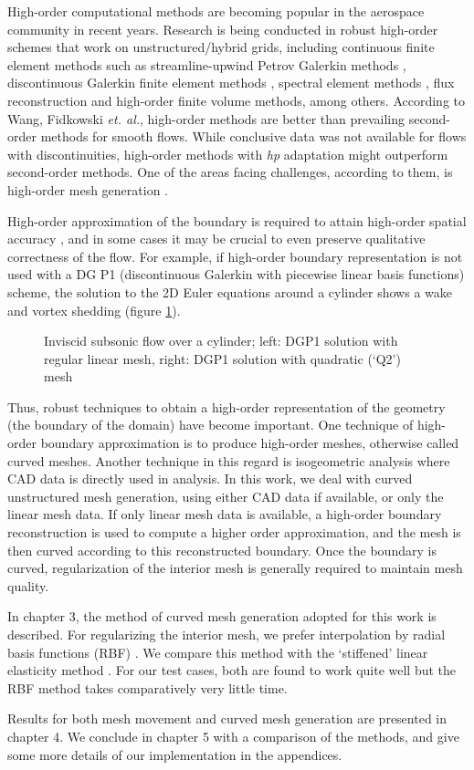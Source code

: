 High-order computational methods are becoming popular in the aerospace community in recent years. Research is being conducted in robust high-order schemes that work on unstructured/hybrid grids, including continuous finite element methods such as streamline-upwind Petrov Galerkin methods \cite{appl:supg}, discontinuous Galerkin finite element methods \cite{solver, curve:hartmann, appl:mavriplis}, spectral element methods \cite{appl:spectral}, flux reconstruction \cite{appl:fr} and high-order finite volume methods, among others. According to Wang, Fidkowski \emph{et. al.}, high-order methods are better than prevailing second-order methods for smooth flows. While conclusive data was not available for flows with discontinuities, high-order methods with \emph{hp} adaptation might outperform second-order methods. One of the areas facing challenges, according to them, is high-order mesh generation \cite{highorder}. 

High-order approximation of the boundary is required to attain high-order spatial accuracy \cite{curve:geomacc}, and in some cases it may be crucial to even preserve qualitative correctness of the flow. For example, if high-order boundary representation is not used with a DG P1 (discontinuous Galerkin with piecewise linear basis functions) scheme, the solution to the 2D Euler equations around a cylinder shows a wake and vortex shedding \cite{appl:dgeuler} (figure \ref{fig:bassi}).
 \begin{figure}[H!]
 	\centering
 	\caption{Inviscid subsonic flow over a cylinder; left: DGP1 solution with regular linear mesh, right: DGP1 solution with quadratic (`Q2') mesh \cite{appl:dgeuler}}
 	\label{fig:bassi}
 \end{figure}
Thus, robust techniques to obtain a high-order representation of the geometry (the boundary of the domain) have become important.  One technique of high-order boundary approximation is to produce high-order meshes, otherwise called curved meshes. Another technique in this regard is isogeometric analysis \cite{isogeometric} where CAD data is directly used in analysis. In this work, we deal with curved unstructured mesh generation, using either CAD data if available, or only the linear mesh data. If only linear mesh data is available, a high-order boundary reconstruction is used to compute a higher order approximation, and the mesh is then curved according to this reconstructed boundary. Once the boundary is curved, regularization of the interior mesh is generally required to maintain mesh quality.

In chapter 3, the method of curved mesh generation adopted for this work is described. For regularizing the interior mesh, we prefer interpolation by radial basis functions (RBF) \cite{rbf:errorwendland}. We compare this method with the `stiffened' linear elasticity method \cite{mm:fsielast}. For our test cases, both are found to work quite well but the RBF method takes comparatively very little time.

Results for both mesh movement and curved mesh generation are presented in chapter 4. We conclude in chapter 5 with a comparison of the methods, and give some more details of our implementation in the appendices.
